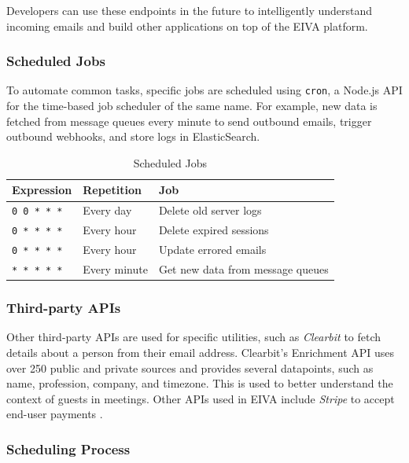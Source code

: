 \documentclass{article}
\begin{document}
Developers can use these endpoints in the future to intelligently understand incoming emails and build other applications on top of the EIVA platform.

\subsubsection{Scheduled Jobs}

To automate common tasks, specific jobs are scheduled using \texttt{cron}, a Node.js API for the time-based job scheduler of the same name. For example, new data is fetched from message queues every minute to send outbound emails, trigger outbound webhooks, and store logs in ElasticSearch.

\begin{table}[!htb]
	\begin{minipage}{1\linewidth}
		\caption{Scheduled Jobs}
		\centering
		\begin{tabular}{lll}
			\hline
			\textbf{Expression} & \textbf{Repetition} & \textbf{Job} \\
			\hline
			\texttt{0 0 * * *} & Every day & Delete old server logs \\
			\texttt{0 * * * *} & Every hour & Delete expired sessions \\
			\texttt{0 * * * *} & Every hour & Update errored emails \\
			\texttt{* * * * *} & Every minute & Get new data from message queues \\
			\hline
		\end{tabular}
	\end{minipage}%
\end{table}

\subsubsection{Third-party APIs}

Other third-party APIs are used for specific utilities, such as \emph{Clearbit} to fetch details about a person from their email address. Clearbit's Enrichment API uses over 250 public and private sources and provides several datapoints, such as name, profession, company, and timezone. This is used to better understand the context of guests in meetings. Other APIs used in EIVA include \emph{Stripe} to accept end-user payments \cite{wittern_web_2018}.

\subsubsection{Scheduling Process}
\end{document}
